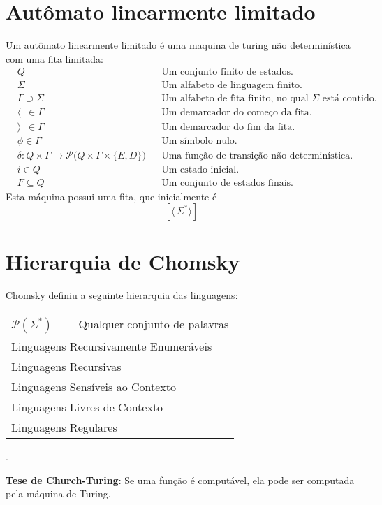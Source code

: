 \documentclass[11pt]{article}
\begin{document}
\section{Autômato linearmente limitado}
\label{sec:orgcee5c6f}
Um autômato linearmente limitado é uma maquina de turing não determinística com uma fita
limitada:
\begin{align*}
  & Q && \text{Um conjunto finito de estados.} \\
  & \Sigma && \text{Um alfabeto de linguagem finito.} \\
  & \Gamma \supset \Sigma && \text{Um alfabeto de fita finito, no qual $\Sigma$ está contido.} \\
  & \langle \enspace \in \Gamma && \text{Um demarcador do começo da fita.} \\
  & \rangle \enspace \in \Gamma && \text{Um demarcador do fim da fita.} \\
  & \phi \in \Gamma && \text{Um símbolo nulo.} \\
  & \delta: Q \times \Gamma \to \mathcal{P}\big(Q \times \Gamma \times \{E, D\}\big) && \text{Uma função de transição não determinística.} \\
  & i \in Q && \text{Um estado inicial.} \\
  & F \subseteq Q && \text{Um conjunto de estados finais.}
\end{align*}
Esta máquina possui uma fita, que inicialmente é
\[
  \left[\langle\,\Sigma^* \rangle\right]
\]
\section{Hierarquia de Chomsky}
\label{sec:orga8ea8c4}
Chomsky definiu a seguinte hierarquia das linguagens:
\begin{table}[H]
  \centering
  \left\downarrow
  \begin{tabular}{l}
    $\mathcal{P}(\Sigma^*) \qquad$ Qualquer conjunto de palavras \\
    Linguagens Recursivamente Enumeráveis \\
    Linguagens Recursivas \\
    Linguagens Sensíveis ao Contexto \\
    Linguagens Livres de Contexto \\
    Linguagens Regulares
  \end{tabular}
  \right.
\end{table}
\textbf{Tese de Church-Turing}: Se uma função é computável, ela pode ser computada pela máquina
de Turing.
\end{document}
